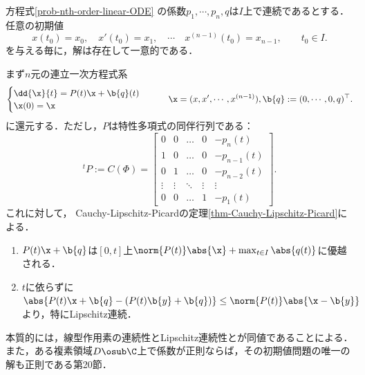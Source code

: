 \documentclass[uplatex,dvipdfmx]{jsreport}
\begin{document}
\begin{theorem}[解の存在と一意性]\label{cor-Cauchy-Lipschitz-Picard-for-Linear-ODE}
    方程式\ref{prob-nth-order-linear-ODE}
    の係数$p_1,\cdots,p_n,q$は$I$上で連続であるとする．
    任意の初期値
    \[x(t_0)=x_0,\quad x'(t_0)=x_1,\quad\cdots\quad x^{(n-1)}(t_0)=x_{n-1},\qquad t_0\in I.\]
    を与える毎に，解は存在して一意的である．
\end{theorem}
\begin{Proof}
    まず$n$元の連立一次方程式系
    \[\begin{cases}
        \dd{\x}{t}=P(t)\x+\b{q}(t)\\
        \x(0)=\x
    \end{cases}\qquad\x=(x,x',\cdots,x^{(n-1)}),\b{q}:=(0,\cdots,0,q)^\top.\]
    に還元する．ただし，$P$は特性多項式の同伴行列である：
    \[{}^t\!P:=C(\Phi)=\begin{bmatrix}
        0 & 0 & \dots & 0 & -p_n(t) \\
        1 & 0 & \dots & 0 & -p_{n-1}(t) \\
        0 & 1 & \dots & 0 & -p_{n-2}(t) \\
        \vdots & \vdots & \ddots & \vdots & \vdots \\
        0 & 0 & \dots & 1 & -p_1(t)
    \end{bmatrix}.\]
    これに対して，
    Cauchy-Lipschitz-Picardの定理\ref{thm-Cauchy-Lipschitz-Picard}による．
    \begin{enumerate}
        \item $P(t)\x+\b{q}$は$[0,t]$上$\norm{P(t)}\abs{\x}+\max_{t\in I}\abs{q(t)}$に優越される．
        \item $t$に依らずに$\abs{P(t)\x+\b{q}-(P(t)\b{y}+\b{q})}\le\norm{P(t)}\abs{\x-\b{y}}$より，特にLipschitz連続．
    \end{enumerate}
\end{Proof}
\begin{remarks}
    本質的には，線型作用素の連続性とLipschitz連続性とが同値であることによる．
    また，ある複素領域$D\osub\C$上で係数が正則ならば，その初期値問題の唯一の解も正則である\cite{吉田耕作-微分方程式}第20節．
\end{remarks}
\end{document}
